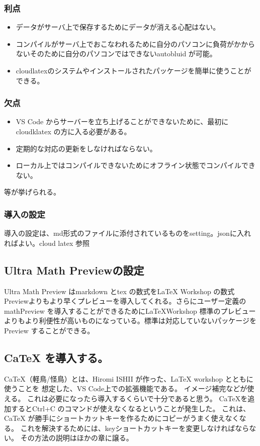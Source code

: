 \documentclass{ltjsarticle}
\begin{document}
\subsubsection*{利点}
\begin{itemize}
  \item データがサーバ上で保存するためにデータが消える心配はない。
  \item コンパイルがサーバ上でおこなわれるために自分のパソコンに負荷がかからないそのために自分のパソコンではできないautobluid が可能。
  \item cloudlatexのシステムやインストールされたパッケージを簡単に使うことができる。
\end{itemize}
\subsubsection*{欠点}
\begin{itemize}
  \item VS Code からサーバーを立ち上げることができないために、最初にcloudklatex の方に入る必要がある。
  \item 定期的な対応の更新をしなければならない。
  \item ローカル上ではコンパイルできないためにオフライン状態でコンパイルできない。
\end{itemize}
等が挙げられる。
\subsubsection{導入の設定}
導入の設定は、md形式のファイルに添付されているものをsetting。jsonに入れればよい。cloud latex 参照
\subsection{Ultra Math Previewの設定}
Ultra Math Preview はmarkdown とtex の数式をLaTeX Workshop の数式Previewよりもより早くプレビューを導入してくれる。さらにユーザー定義のmathPreview を導入することができるためにLaTeXWorkshop 標準のプレビューよりもより利便性が高いものになっている。標準は対応していないパッケージをPreview することができる。
\subsection{CaTeX を導入する。}
CaTeX（軽鳥/怪鳥）とは、Hiromi ISHII が作った、LaTeX workshop とともに使うことを
想定した、VS Code上での拡張機能である。
イメージ補完などが使える。
これは必要になったら導入するくらいで十分であると思う。
CaTeXを追加するとCtrl+C のコマンドが使えなくなるということが発生した。
これは、CaTeX が勝手にショートカットキーを作るためにコピーがうまく使えなくなる。
これを解決するためには、keyショートカットキーを変更しなければならない。
その方法の説明はほかの章に譲る。
\end{document}

